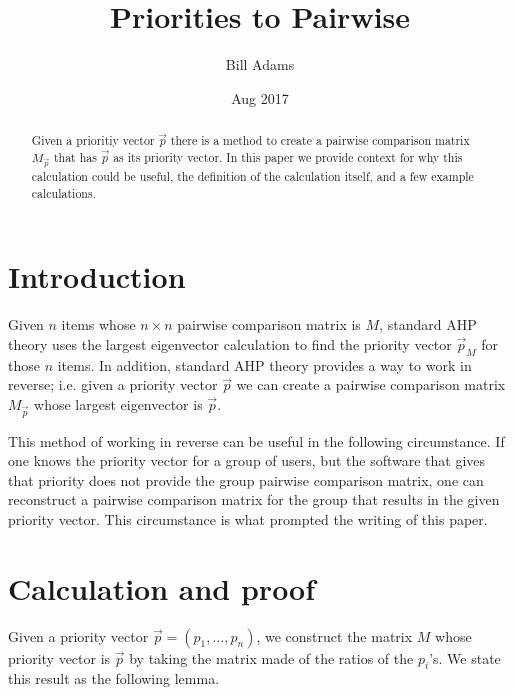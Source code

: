 \documentclass[10pt,twoside]{article}
\title{Priorities to Pairwise}
\author{Bill Adams}
\date{Aug 2017}
\begin{document}
\maketitle

\begin{abstract}
Given a prioritiy vector $\vec{p}$ there is a method to create a pairwise comparison matrix $M_{\vec{p}}$ that has $\vec{p}$ as its priority vector.  In this paper we provide context for why this calculation could be useful, the definition of the calculation itself, and a few example calculations.
\end{abstract}

\section{Introduction}
Given $n$ items whose $n \times n$ pairwise comparison matrix is $M$, standard
AHP theory uses the largest eigenvector calculation to find the priority vector
$\vec{p}_M$ for those $n$ items.  In addition, standard AHP theory provides a way
to work in reverse; i.e. given a priority vector $\vec{p}$ we can create a
pairwise comparison matrix $M_{\vec{p}}$ whose largest eigenvector is $\vec{p}$.

This method of working in reverse can be useful in the following circumstance.
If one knows the priority vector for a group of users, but the software that gives
that priority does not provide the group pairwise comparison matrix, one can
reconstruct a pairwise comparison matrix for the group that results in the
given priority vector.  This circumstance is what prompted the writing of this
paper.

\section{Calculation and proof}
Given a priority vector $\vec{p}=(p_1, \ldots, p_n)$, we construct the matrix $M$
whose priority vector is $\vec{p}$ by taking the matrix
made of the ratios of the $p_i$'s.  We state this result as the following lemma.
\end{document}
